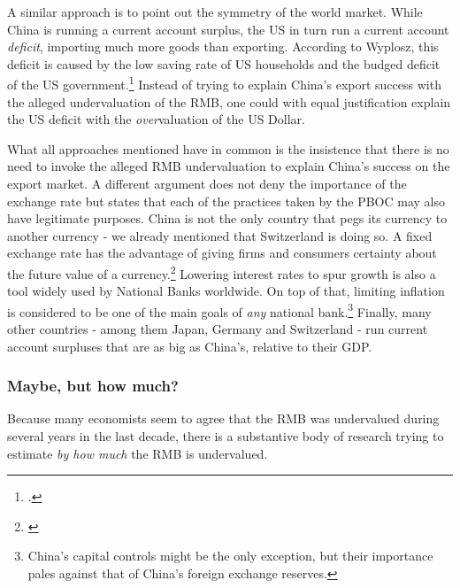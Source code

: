 A similar approach is to point out the symmetry of the world market. 
While China is running a current account surplus, the US in turn run a 
current account \emph{deficit}, importing much more goods than 
exporting. According to Wyplosz, this deficit is caused by the low 
saving rate of US households and the budged deficit of the US 
government.\footnote{\cite[pp. 39-40]{Wyplosz2010}.} Instead of trying 
to explain China's export success with the alleged undervaluation of the 
RMB, one could with equal justification explain the US deficit with the 
\emph{over}valuation of the US Dollar. 

What all approaches mentioned have in common is the insistence that 
there is no need to invoke the alleged RMB undervaluation to explain 
China's success on the export market. A different argument does not deny 
the importance of the exchange rate but states that each of the 
practices taken by the PBOC may also have legitimate purposes. China is 
not the only country that pegs its currency to another currency - we 
already mentioned that Switzerland is doing so. A fixed exchange rate 
has the advantage of giving firms and consumers certainty about the 
future value of a currency.\footnote{\cite[p.  515]{Krugman2008}} 
Lowering interest rates to spur growth is also a tool widely used by 
National Banks worldwide. On top of that, limiting inflation is 
considered to be one of the main goals of \emph{any} national 
bank.\footnote{China's capital controls might be the only exception, but 
	their importance pales against that of China's foreign exchange 
reserves.} Finally, many other countries - among them Japan, Germany and 
Switzerland - run current account surpluses that are as big as China's, 
relative to their GDP.


\subsubsection{Maybe, but how much?}

Because many economists seem to agree that the RMB was undervalued during several years in the last decade, there is a substantive body of research trying to estimate \emph{by how much} the RMB is undervalued.

